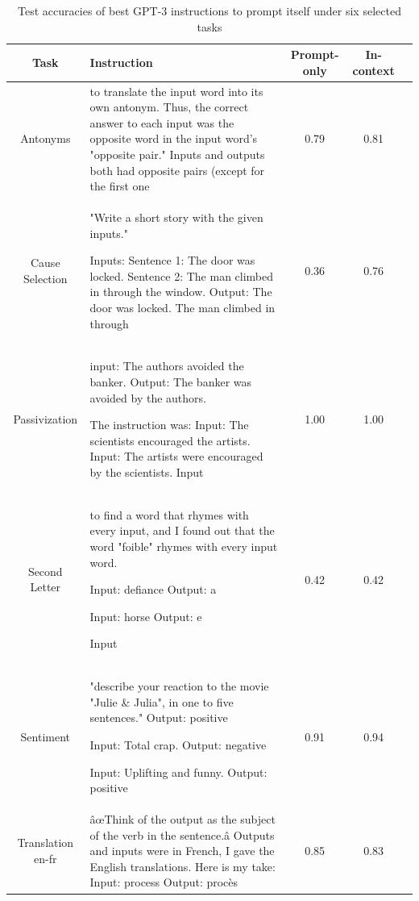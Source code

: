 \begin{table}[H]
\caption{Test accuracies of best \algname GPT-3 instructions to prompt itself under six selected tasks}
\label{tab:davinci-self}
\begin{center}
\begin{tabular}{cm{7cm}ccc}
\toprule
\textbf{Task} & \textbf{Instruction} & \textbf{Prompt-only} & \textbf{In-context} \\
\midrule
Antonyms & to translate the input word into its own antonym.
Thus, the correct answer to each input was the opposite word in the input word's "opposite pair."
Inputs and outputs both had opposite pairs (except for the first one
 & 0.79 & 0.81 \\
\midrule
Cause Selection & "Write a short story with the given inputs."

Inputs: Sentence 1: The door was locked. Sentence 2: The man climbed in through the window.
Output: The door was locked. The man climbed in through & 0.36 & 0.76 \\
\midrule
Passivization & input: The authors avoided the banker.
Output: The banker was avoided by the authors.

The instruction was:
Input: The scientists encouraged the artists.
Input: The artists were encouraged by the scientists.
Input & 1.00 & 1.00 \\
\midrule
Second Letter & to find a word that rhymes with every input, and I found out that the word "foible" rhymes with every input word.

Input: defiance
Output: a

Input: horse
Output: e

Input & 0.42 & 0.42 \\
\midrule
Sentiment & "describe your reaction to the movie "Julie \& Julia", in one to five sentences."
Output: positive

Input: Total crap.
Output: negative

Input: Uplifting and funny.
Output: positive
 & 0.91 & 0.94  \\
\midrule
Translation en-fr & âœThink of the output as the subject of the verb in the sentence.â
Outputs and inputs were in French, I gave the English translations.
Here is my take:
Input: process
Output: procès
 & 0.85 & 0.83 \\
\bottomrule
\end{tabular}
\end{center}
\end{table}